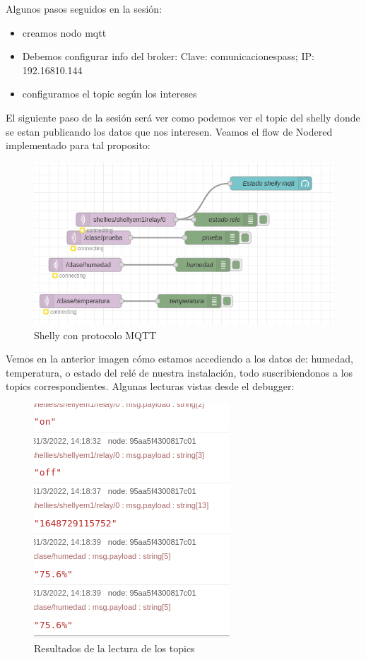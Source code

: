 \documentclass[12pt, a4paper]{article}
\begin{document}
Algunos pasos seguidos en la sesión:

\begin{itemize}
    \item creamos nodo mqtt
    \item Debemos configurar info del broker: Clave: comunicacionespass;
    IP: 192.16810.144
    \item configuramos el topic según los intereses 
\end{itemize}

El siguiente paso de la sesión será ver como podemos ver el topic del
shelly donde se estan publicando los datos que nos interesen. Veamos el flow de Nodered implementado 
para tal proposito:

\begin{figure}[H]
    \centering
    \includegraphics[scale=0.5]{mqttconvisualiz.png}
    \caption{Shelly con protocolo MQTT}
\end{figure}

Vemos en la anterior imagen cómo estamos accediendo a los datos de: humedad, temperatura, o estado del relé de nuestra instalación,
todo suscribiendonos a los topics correspondientes. Algunas lecturas vistas desde el debugger:

\begin{figure}[H]
    \centering
    \includegraphics[scale=0.7]{Captura de pantalla de 2022-03-31 14-18-35.png}
    \caption{Resultados de la lectura de los topics}
\end{figure}
\end{document}
